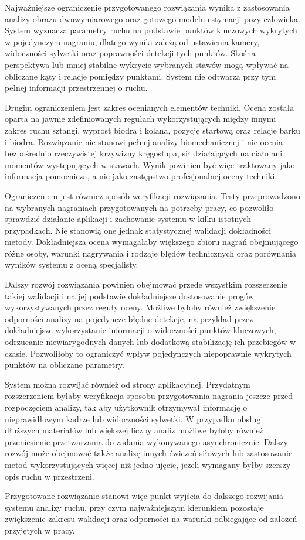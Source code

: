 Najważniejsze ograniczenie przygotowanego rozwiązania wynika z zastosowania analizy obrazu dwuwymiarowego oraz gotowego modelu estymacji pozy człowieka. System wyznacza parametry ruchu na podstawie punktów kluczowych wykrytych w pojedynczym nagraniu, dlatego wyniki zależą od ustawienia kamery, widoczności sylwetki oraz poprawności detekcji tych punktów. Skośna perspektywa lub mniej stabilne wykrycie wybranych stawów mogą wpływać na obliczane kąty i relacje pomiędzy punktami. System nie odtwarza przy tym pełnej informacji przestrzennej o ruchu.

Drugim ograniczeniem jest zakres ocenianych elementów techniki. Ocena została oparta na jawnie zdefiniowanych regułach wykorzystujących między innymi zakres ruchu sztangi, wyprost biodra i kolana, pozycję startową oraz relację barku i biodra. Rozwiązanie nie stanowi pełnej analizy biomechanicznej i nie ocenia bezpośrednio rzeczywistej krzywizny kręgosłupa, sił działających na ciało ani momentów występujących w stawach. Wynik powinien być więc traktowany jako informacja pomocnicza, a nie jako zastępstwo profesjonalnej oceny techniki.

Ograniczeniem jest również sposób weryfikacji rozwiązania. Testy przeprowadzono na wybranych nagraniach przygotowanych na potrzeby pracy, co pozwoliło sprawdzić działanie aplikacji i zachowanie systemu w kilku istotnych przypadkach. Nie stanowią one jednak statystycznej walidacji dokładności metody. Dokładniejsza ocena wymagałaby większego zbioru nagrań obejmującego różne osoby, warunki nagrywania i rodzaje błędów technicznych oraz porównania wyników systemu z oceną specjalisty.

Dalszy rozwój rozwiązania powinien obejmować przede wszystkim rozszerzenie takiej walidacji i na jej podstawie dokładniejsze dostosowanie progów wykorzystywanych przez reguły oceny. Możliwe byłoby również zwiększenie odporności analizy na pojedyncze błędne detekcje, na przykład przez dokładniejsze wykorzystanie informacji o widoczności punktów kluczowych, odrzucanie niewiarygodnych danych lub dodatkową stabilizację ich przebiegów w czasie. Pozwoliłoby to ograniczyć wpływ pojedynczych niepoprawnie wykrytych punktów na obliczane parametry.

System można rozwijać również od strony aplikacyjnej. Przydatnym rozszerzeniem byłaby weryfikacja sposobu przygotowania nagrania jeszcze przed rozpoczęciem analizy, tak aby użytkownik otrzymywał informację o nieprawidłowym kadrze lub widoczności sylwetki. W przypadku obsługi dłuższych materiałów lub większej liczby analiz możliwe byłoby również przeniesienie przetwarzania do zadania wykonywanego asynchronicznie. Dalszy rozwój może obejmować także analizę innych ćwiczeń siłowych lub zastosowanie metod wykorzystujących więcej niż jedno ujęcie, jeżeli wymagany byłby szerszy opis ruchu w przestrzeni.

Przygotowane rozwiązanie stanowi więc punkt wyjścia do dalszego rozwijania systemu analizy ruchu, przy czym najważniejszym kierunkiem pozostaje zwiększenie zakresu walidacji oraz odporności na warunki odbiegające od założeń przyjętych w pracy.